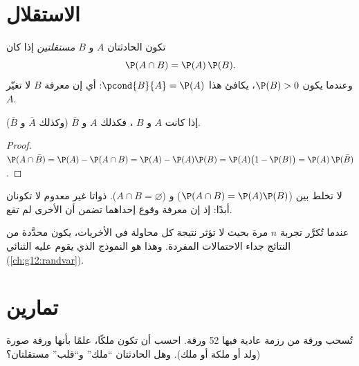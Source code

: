 \section{الاستقلال}

\begin{definition}\label{def:g12:condprob:indep}
تكون الحادثتان $A$ و $B$ \emph{مستقلتين} إذا كان
\[
\P(A \cap B) = \P(A)\,\P(B) .
\]
وعندما يكون $\P(B) > 0$، يكافئ هذا $\pcond{B}{A} = \P(A)$: أي إن معرفة $B$
لا تغيّر  $A$.
\end{definition}

\begin{proposition}\label{prop:g12:condprob:indepcompl}
إذا كانت $A$ و $B$ ، فكذلك $A$ و $\bar B$ (وكذلك $\bar A$ و
$\bar B$).
\end{proposition}

\begin{proof}
$\P(A \cap \bar B) = \P(A) - \P(A \cap B) = \P(A) - \P(A)\P(B)
= \P(A)\bigl(1 - \P(B)\bigr) = \P(A)\,\P(\bar B)$.
\end{proof}

\begin{remark}
لا تخلط بين \emph{} ($\P(A\cap B) = \P(A)\P(B)$) و
\emph{} ($A \cap B = \varnothing$).  ذواتا
 غير معدوم لا تكونان  أبدًا: إذ إن معرفة وقوع إحداهما تضمن
أن الأخرى لم تقع.
\end{remark}

\begin{definition}\label{def:g12:condprob:repet}
عندما تُكرَّر تجربة $n$ مرة بحيث لا تؤثر نتيجة كل محاولة
في الأخريات، يكون   محدَّدة من
النتائج جداء الاحتمالات المفردة. وهذا هو النموذج
الذي يقوم عليه  الثنائي (\cref{ch:g12:randvar}).
\end{definition}

\section{تمارين}

\begin{exercise}[$\star$]\label{exo:g12:condprob:1}
تُسحب ورقة من رزمة عادية فيها 52 ورقة. احسب  أن
تكون ملكًا، علمًا بأنها ورقة صورة (ولد أو ملكة أو ملك). وهل
الحادثتان ``ملك'' و``قلب'' مستقلتان؟
\end{exercise}

